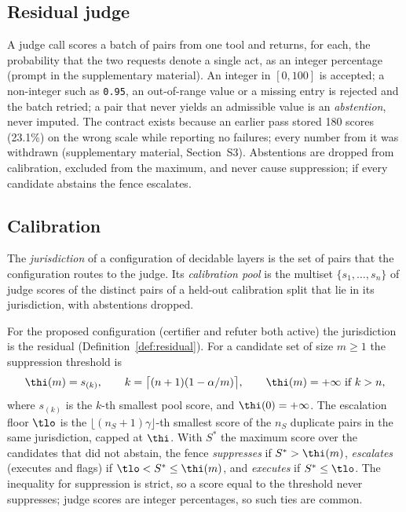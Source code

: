 \subsection{Residual judge}\label{sec:judge}

A judge call scores a batch of pairs from one tool and returns, for each, the probability that the two requests denote a single act, as an integer percentage (prompt in the supplementary material). An integer in $[0,100]$ is accepted; a non-integer such as \texttt{0.95}, an out-of-range value or a missing entry is rejected and the batch retried; a pair that never yields an admissible value is an \emph{abstention}, never imputed. The contract exists because an earlier pass stored 180 scores (23.1\%) on the wrong scale while reporting no failures; every number from it was withdrawn (supplementary material, Section~S3). Abstentions are dropped from calibration, excluded from the maximum, and never cause suppression; if every candidate abstains the fence escalates.

\subsection{Calibration}\label{sec:calibration}

\begin{definition}\label{def:jurisdiction}
The \emph{jurisdiction} of a configuration of decidable layers is the set of pairs that the configuration routes to the judge. Its \emph{calibration pool} is the multiset $\{s_1,\dots,s_n\}$ of judge scores of the distinct pairs of a held-out calibration split that lie in its jurisdiction, with abstentions dropped.
\end{definition}

For the proposed configuration (certifier and refuter both active) the jurisdiction is the residual (Definition~\ref{def:residual}). For a candidate set of size $m\ge1$ the suppression threshold is
\begin{equation}\label{eq:thi}
\thi(m)=s_{(k)},\qquad k=\big\lceil (n+1)(1-\alpha/m)\big\rceil,\qquad \thi(m)=+\infty \text{ if } k>n,
\end{equation}
where $s_{(k)}$ is the $k$-th smallest pool score, and $\thi(0)=+\infty$. The escalation floor $\tlo$ is the $\lfloor (n_S+1)\gamma\rfloor$-th smallest score of the $n_S$ duplicate pairs in the same jurisdiction, capped at $\thi$. With $S^\ast$ the maximum score over the candidates that did not abstain, the fence \emph{suppresses} if $S^\ast>\thi(m)$, \emph{escalates} (executes and flags) if $\tlo<S^\ast\le\thi(m)$, and \emph{executes} if $S^\ast\le\tlo$. The inequality for suppression is strict, so a score equal to the threshold never suppresses; judge scores are integer percentages, so such ties are common.

